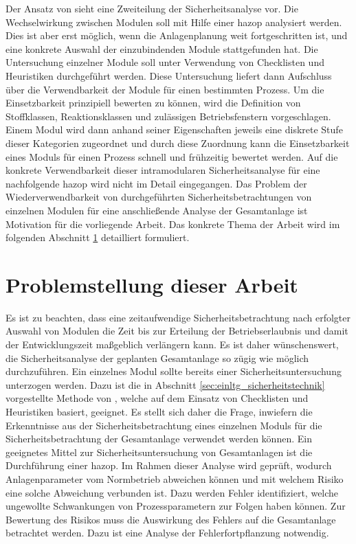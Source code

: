 Der Ansatz von \citeauthor{Fleischer_2015} sieht eine Zweiteilung der Sicherheitsanalyse vor. Die Wechselwirkung zwischen Modulen soll mit Hilfe einer \ac{hazop} analysiert werden. Dies ist aber erst m\"oglich, wenn die Anlagenplanung weit fortgeschritten ist, und eine konkrete Auswahl der einzubindenden Module stattgefunden hat. Die Untersuchung einzelner Module soll unter Verwendung von Checklisten und Heuristiken durchgef\"uhrt werden. Diese Untersuchung  liefert dann Aufschluss \"uber die Verwendbarkeit der Module f\"ur einen bestimmten Prozess. Um die Einsetzbarkeit prinzipiell bewerten zu k\"onnen, wird die Definition von Stoffklassen, Reaktionsklassen und zul\"assigen Betriebsfenstern vorgeschlagen. Einem Modul wird dann anhand seiner Eigenschaften jeweils eine diskrete Stufe dieser Kategorien zugeordnet und durch diese Zuordnung kann die Einsetzbarkeit eines Moduls f\"ur einen Prozess schnell und fr\"uhzeitig bewertet werden. Auf die konkrete Verwendbarkeit dieser intramodularen Sicherheitsanalyse f\"ur eine nachfolgende \ac{hazop} wird nicht im Detail eingegangen. Das Problem der Wiederverwendbarkeit von durchgef\"uhrten Sicherheitsbetrachtungen von einzelnen Modulen f\"ur eine anschlie\ss{}ende Analyse der Gesamtanlage ist Motivation f\"ur die vorliegende Arbeit. Das konkrete Thema der Arbeit wird im folgenden Abschnitt \ref{sec:einltg_aufgabe} detailliert formuliert.

\section{Problemstellung dieser Arbeit}\label{sec:einltg_aufgabe}

Es ist zu beachten, dass eine zeitaufwendige Sicherheitsbetrachtung nach erfolgter Auswahl von Modulen die Zeit bis zur Erteilung der Betriebserlaubnis und damit der Entwicklungszeit ma\ss{}geblich verl\"angern kann. Es ist daher w\"unschenswert, die Sicherheitsanalyse der geplanten Gesamtanlage so z\"ugig wie m\"oglich durchzuf\"uhren. \newline
Ein einzelnes Modul sollte bereits einer Sicherheitsuntersuchung unterzogen werden. Dazu ist die in Abschnitt \ref{sec:einltg_sicherheitstechnik} vorgestellte Methode von \citeauthor{Fleischer_2015}, welche auf dem Einsatz von Checklisten und Heuristiken basiert, geeignet.  Es stellt sich daher die Frage, inwiefern die Erkenntnisse aus der Sicherheitsbetrachtung eines einzelnen Moduls f\"ur die Sicherheitsbetrachtung der Gesamtanlage verwendet werden k\"onnen. \newline
Ein geeignetes Mittel zur Sicherheitsuntersuchung von Gesamtanlagen ist die Durchf\"uhrung einer \ac{hazop}. Im Rahmen dieser Analyse wird gepr\"uft, wodurch Anlagenparameter vom Normbetrieb abweichen k\"onnen und mit welchem Risiko eine solche Abweichung verbunden ist. Dazu werden Fehler identifiziert, welche ungewollte Schwankungen von Prozessparametern zur Folgen haben k\"onnen. Zur Bewertung des Risikos muss die Auswirkung des Fehlers auf die Gesamtanlage betrachtet werden. Dazu ist eine Analyse der Fehlerfortpflanzung notwendig. 

